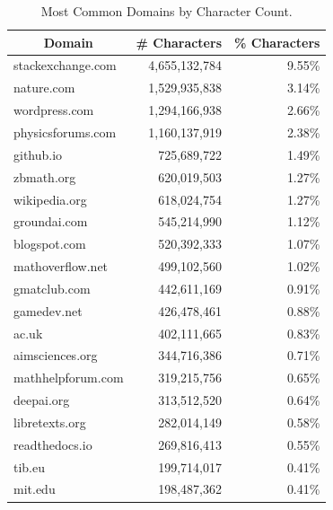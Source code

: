 \begin{table}[b!]
\begin{minipage}{0.48\textwidth}
{\begin{tabular}{lrr}
        \multicolumn{1}{c}{\bf Domain}  &\multicolumn{1}{c}{\bf \# Characters} & \multicolumn{1}{c}{\bf \% Characters}\\
                \midrule
                stackexchange.com & 4,655,132,784 & 9.55\% \\ 
                nature.com & 1,529,935,838 & 3.14\% \\ 
                wordpress.com & 1,294,166,938 & 2.66\% \\ 
                physicsforums.com & 1,160,137,919 & 2.38\% \\ 
                github.io & 725,689,722 & 1.49\% \\ 
                zbmath.org & 620,019,503 & 1.27\% \\ 
                wikipedia.org & 618,024,754 & 1.27\% \\ 
                groundai.com & 545,214,990 & 1.12\% \\ 
                blogspot.com & 520,392,333 & 1.07\% \\ 
                mathoverflow.net & 499,102,560 & 1.02\% \\ 
                gmatclub.com & 442,611,169 & 0.91\% \\ 
                gamedev.net & 426,478,461 & 0.88\% \\ 
                ac.uk & 402,111,665 & 0.83\% \\ 
                aimsciences.org & 344,716,386 & 0.71\% \\ 
                mathhelpforum.com & 319,215,756 & 0.65\% \\ 
                deepai.org & 313,512,520 & 0.64\% \\ 
                libretexts.org & 282,014,149 & 0.58\% \\ 
                readthedocs.io & 269,816,413 & 0.55\% \\ 
                tib.eu & 199,714,017 & 0.41\% \\ 
                mit.edu & 198,487,362 & 0.41\% \\
        \end{tabular}
        }
        \caption{Most Common Domains by Character Count.}
        \label{table:top-domains-by-characters}
    \end{minipage}
\end{table}